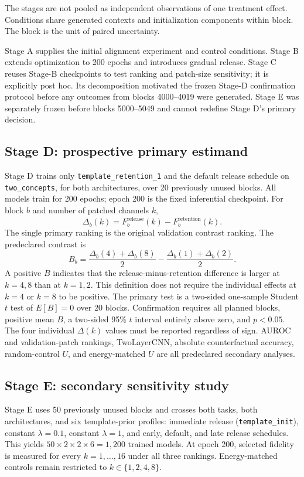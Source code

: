 \documentclass[10pt]{article}
\begin{document}
The stages are not pooled as independent observations of one treatment effect. Conditions share generated contexts and initialization components within block. The block is the unit of paired uncertainty.

Stage A supplies the initial alignment experiment and control conditions. Stage B extends optimization to 200 epochs and introduces gradual release. Stage C reuses Stage-B checkpoints to test ranking and patch-size sensitivity; it is explicitly post hoc. Its decomposition motivated the frozen Stage-D confirmation protocol before any outcomes from blocks 4000--4019 were generated. Stage E was separately frozen before blocks 5000--5049 and cannot redefine Stage D's primary decision.

\subsection{Stage D: prospective primary estimand}\label{sec:stage-d-method}

Stage D trains only \texttt{template\_retention\_1} and the default release schedule on \texttt{two\_concepts}, for both architectures, over 20 previously unused blocks. All models train for 200 epochs; epoch 200 is the fixed inferential checkpoint. For block $b$ and number of patched channels $k$,
\[
\Delta_b(k)=F_{b}^{\mathrm{release}}(k)-F_{b}^{\mathrm{retention}}(k).
\]
The single primary ranking is the original validation contrast ranking. The predeclared contrast is
\[
B_b=\frac{\Delta_b(4)+\Delta_b(8)}{2}
-\frac{\Delta_b(1)+\Delta_b(2)}{2}.
\]
A positive $B$ indicates that the release-minus-retention difference is larger at $k=4,8$ than at $k=1,2$. This definition does not require the individual effects at $k=4$ or $k=8$ to be positive. The primary test is a two-sided one-sample Student $t$ test of $E[B]=0$ over 20 blocks. Confirmation requires all planned blocks, positive mean $B$, a two-sided 95\% $t$ interval entirely above zero, and $p<0.05$. The four individual $\Delta(k)$ values must be reported regardless of sign. AUROC and validation-patch rankings, TwoLayerCNN, absolute counterfactual accuracy, random-control $U$, and energy-matched $U$ are all predeclared secondary analyses.

\subsection{Stage E: secondary sensitivity study}\label{sec:stage-e-method}

Stage E uses 50 previously unused blocks and crosses both tasks, both architectures, and six template-prior profiles: immediate release (\texttt{template\_init}), constant $\lambda=0.1$, constant $\lambda=1$, and early, default, and late release schedules. This yields $50\times2\times2\times6=1{,}200$ trained models. At epoch 200, selected fidelity is measured for every $k=1,\ldots,16$ under all three rankings. Energy-matched controls remain restricted to $k\in\{1,2,4,8\}$.
\end{document}
